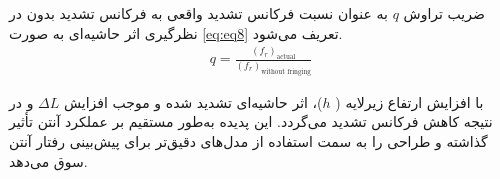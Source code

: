 ضریب تراوش
$q$
 به عنوان نسبت فرکانس تشدید واقعی به فرکانس تشدید بدون در نظرگیری اثر حاشیه‌ای به صورت
\eqref{eq:eq8}
  تعریف می‌شود.
\begin{align}
	\label{eq:eq7}
	q = \frac{(f_r)_{\text{actual}}}{(f_r)_{\text{without fringing}}}
\end{align}

با افزایش ارتفاع زیرلایه (
$h$)،
 اثر حاشیه‌ای تشدید شده و موجب افزایش
 $\Delta L$
  و در نتیجه کاهش فرکانس تشدید می‌گردد. این پدیده به‌طور مستقیم بر عملکرد آنتن تأثیر گذاشته و طراحی را به سمت استفاده از مدل‌های دقیق‌تر برای پیش‌بینی رفتار آنتن سوق می‌دهد.











